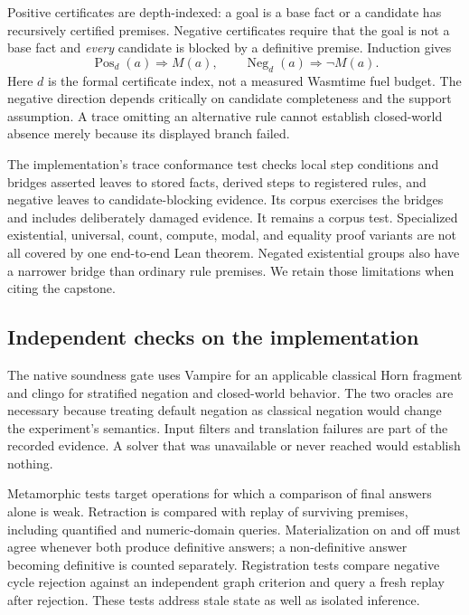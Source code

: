 Positive certificates are depth-indexed: a goal is a base fact or a candidate
has recursively certified premises. Negative certificates require that the goal
is not a base fact and \emph{every} candidate is blocked by a definitive premise.
Induction gives
\[
  \operatorname{Pos}_d(a)\Rightarrow M(a),\qquad
  \operatorname{Neg}_d(a)\Rightarrow\neg M(a).
\]
Here $d$ is the formal certificate index, not a measured Wasmtime fuel budget.
The negative direction depends critically on candidate completeness and the
support assumption. A trace omitting an alternative rule cannot establish
closed-world absence merely because its displayed branch failed.

The implementation's trace conformance test checks local step conditions and
bridges asserted leaves to stored facts, derived steps to registered rules,
and negative leaves to candidate-blocking evidence. Its corpus exercises the
bridges and includes deliberately damaged evidence. It remains a corpus test.
Specialized existential, universal, count, compute, modal, and equality
proof variants are not all covered by one end-to-end Lean theorem. Negated
existential groups also have a narrower bridge than ordinary rule premises.
We retain those limitations when citing the capstone.

\subsection{Independent checks on the implementation}

The native soundness gate uses Vampire for an applicable classical Horn
fragment and clingo for stratified negation and closed-world behavior.
The two oracles are necessary because treating default negation as classical
negation would change the experiment's semantics. Input filters and translation
failures are part of the recorded evidence. A solver that was unavailable or
never reached would establish nothing.

Metamorphic tests target operations for which a comparison of final answers
alone is weak. Retraction is compared with replay of surviving premises,
including quantified and numeric-domain queries. Materialization on and off
must agree whenever both produce definitive answers; a non-definitive answer
becoming definitive is counted separately. Registration tests compare negative
cycle rejection against an independent graph criterion and query a fresh replay
after rejection. These tests address stale state as well as isolated inference.

